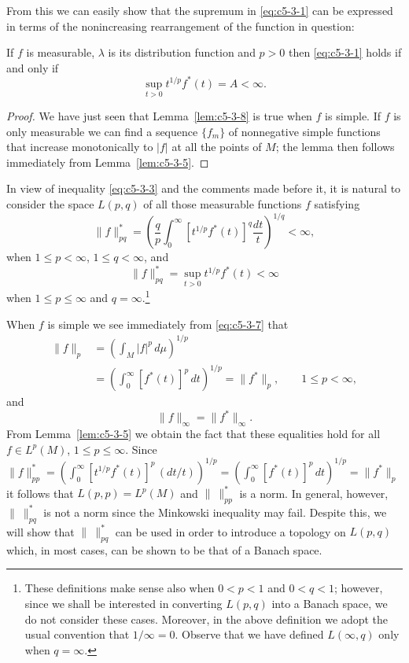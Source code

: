 From this we can easily show that the supremum in \eqref{eq:c5-3-1} can be
expressed in terms of the nonincreasing rearrangement of the function in
question:

\begin{lemma}\label{lem:c5-3-8}
If $f$ is measurable, $\lambda$ is its distribution function and $p > 0$ then
\eqref{eq:c5-3-1} holds if and only if
\[
\sup_{t>0}t^{1/p}f^{*}(t)=A<\infty.
\]
\end{lemma}

\begin{proof}
We have just seen that Lemma~\ref{lem:c5-3-8} is true when $f$ is simple. If
$f$ is only measurable we can find a sequence $\{f_{m}\}$ of nonnegative simple
functions that increase monotonically to $|f|$ at all the points of $M$; the
lemma then follows immediately from Lemma~\ref{lem:c5-3-5}.
\end{proof}

In view of inequality \eqref{eq:c5-3-3} and the comments made before it, it is
natural to consider the space $L(p, q)$ of all those measurable functions $f$
satisfying
\[
\|f\|_{pq}^{*}=\left(\frac{q}{p}\int_{0}^{\infty}[t^{1/p}f^{*}(t)]^{q}\frac{dt}{t}\right)^{1/q}<\infty,
\]
when $1 \leq p < \infty$, $1 \leq q < \infty$, and
\[
\|f\|_{pq}^{*}=\sup_{t>0}t^{1/p}f^{*}(t)<\infty
\]
when $1 \leq p \leq \infty$ and $q = \infty$.\footnote{These definitions make
sense also when $0 < p < 1$ and $0 < q < 1$; however, since we shall be
interested in converting $L(p, q)$ into a Banach space, we do not consider
these cases. Moreover, in the above definition we adopt the usual convention
that $1/\infty = 0$. Observe that we have defined $L(\infty, q)$ only when
$q = \infty$.}

When $f$ is simple we see immediately from \eqref{eq:c5-3-7} that
\begin{equation}\label{eq:c5-3-9}
\begin{aligned}\|f\|_{p}&=\left(\int_{M}|f|^{p}\,d\mu\right)^{1/p}\\
&=\left(\int_{0}^{\infty}[f^{*}(t)]^{p}\,dt\right)^{1/p}=\|f^{*}\|_{p},
\qquad 1 \leq p < \infty,\end{aligned}
\end{equation}
and
\begin{equation}\label{eq:c5-3-9p}
\tag{3.9$'$}
\|f\|_{\infty}=\|f^{*}\|_{\infty}.
\end{equation}
From Lemma~\ref{lem:c5-3-5} we obtain the fact that these equalities hold for
all $f \in L^{p}(M)$, $1 \leq p \leq \infty$. Since
$\|f\|_{pp}^{*} = (\int_{0}^{\infty}[t^{1/p}f^{*}(t)]^{p}\,(dt/t))^{1/p} = (\int_{0}^{\infty}[f^{*}(t)]^{p}\,dt)^{1/p} = \|f^{*}\|_{p}$
it follows that $L(p, p) = L^{p}(M)$ and $\|\ \|_{pp}^{*}$ is a norm. In
general, however, $\|\ \|_{pq}^{*}$ is not a norm since the Minkowski
inequality may fail. Despite this, we will show that $\|\ \|_{pq}^{*}$ can be
used in order to introduce a topology on $L(p, q)$ which, in most cases, can be
shown to be that of a Banach space.

